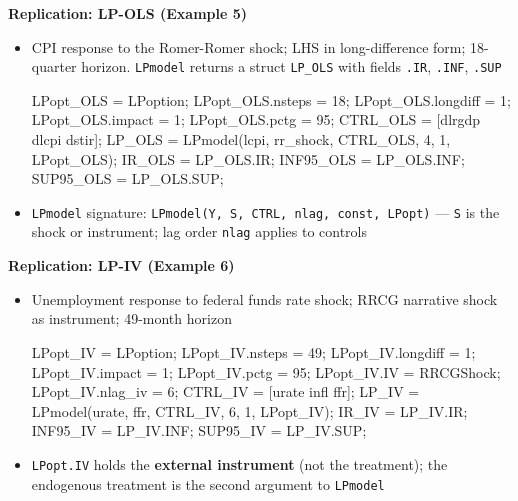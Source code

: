\documentclass[10pt,handout]{beamer}
\begin{document}
\begin{frame}[fragile]
{\textbf{Replication: LP-OLS (Example 5)}}
\begin{itemize}
\item CPI response to the Romer-Romer shock; LHS in long-difference form; 18-quarter horizon. \texttt{LPmodel} returns a struct \texttt{LP\_OLS} with fields \texttt{.IR}, \texttt{.INF}, \texttt{.SUP}
\par\smallskip
\begin{matlabcode}
LPopt_OLS          = LPoption;
LPopt_OLS.nsteps   = 18;        %
LPopt_OLS.longdiff = 1;         %
LPopt_OLS.impact   = 1;         %
LPopt_OLS.pctg     = 95;
CTRL_OLS = [dlrgdp dlcpi dstir];
LP_OLS   = LPmodel(lcpi, rr_shock, CTRL_OLS, 4, 1, LPopt_OLS);
IR_OLS     = LP_OLS.IR;
INF95_OLS  = LP_OLS.INF;
SUP95_OLS  = LP_OLS.SUP;
\end{matlabcode}
\medskip
\item \colorbox{script!80}{\small\texttt{LPmodel}} signature: \colorbox{script!80}{\small\texttt{LPmodel(Y, S, CTRL, nlag, const, LPopt)}} --- \colorbox{script!80}{\small\texttt{S}} is the shock or instrument; lag order \colorbox{script!80}{\small\texttt{nlag}} applies to controls
\end{itemize}
\end{frame}


\begin{frame}[fragile]
{\textbf{Replication: LP-IV (Example 6)}}
\begin{itemize}
\item Unemployment response to federal funds rate shock; RRCG narrative shock as instrument; 49-month horizon
\par\smallskip
\begin{matlabcode}
LPopt_IV          = LPoption;
LPopt_IV.nsteps   = 49;        %
LPopt_IV.longdiff = 1;         %
LPopt_IV.impact   = 1;         %
LPopt_IV.pctg     = 95;
LPopt_IV.IV       = RRCGShock;
LPopt_IV.nlag_iv  = 6;         %
CTRL_IV = [urate infl ffr];
LP_IV   = LPmodel(urate, ffr, CTRL_IV, 6, 1, LPopt_IV);
IR_IV     = LP_IV.IR;
INF95_IV  = LP_IV.INF;
SUP95_IV  = LP_IV.SUP;
\end{matlabcode}
\medskip
\item \colorbox{script!80}{\small\texttt{LPopt.IV}} holds the \textbf{external instrument} (not the treatment); the endogenous treatment is the second argument to \colorbox{script!80}{\small\texttt{LPmodel}}
\end{itemize}
\end{frame}
\end{document}
